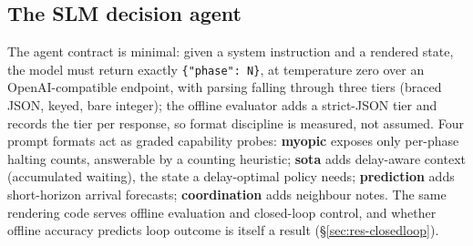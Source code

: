 \subsection{The SLM decision agent}\label{sec:des-agent}
The agent contract is minimal: given a system instruction and a rendered
state, the model must return exactly \texttt{\{"phase": N\}}, at
temperature zero over an OpenAI-compatible endpoint, with parsing falling
through three tiers (braced JSON, keyed, bare integer); the offline
evaluator adds a strict-JSON tier and records the tier per response, so
format discipline is measured, not assumed. Four prompt formats act as
graded capability probes: \textbf{myopic} exposes only per-phase halting
counts, answerable by a counting heuristic; \textbf{sota} adds delay-aware
context (accumulated waiting), the state a delay-optimal policy needs;
\textbf{prediction} adds short-horizon arrival forecasts;
\textbf{coordination} adds neighbour notes. The same rendering code serves
offline evaluation and closed-loop control, and whether offline accuracy
predicts loop outcome is itself a result (\S\ref{sec:res-closedloop}).
